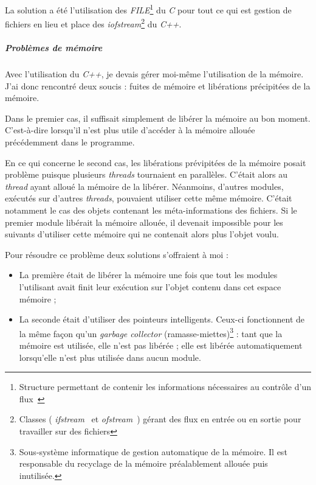 \documentclass[a4paper,10pt, twoside]{report}
\begin{document}
\begin{spacing}{1.2}
La solution a été l'utilisation des \textit{FILE}\footnote{Structure
permettant de contenir les informations nécessaires au contrôle d'un
flux~\cite{refFILE}} du \textit{C} pour tout ce qui est gestion de fichiers en
lieu et place des \textit{iofstream}\footnote{Classes (
\textit{ifstream}~\cite{refIFS} et \textit{ofstream}~\cite{refOFS}) gérant
des flux en entrée ou en sortie pour travailler sur des fichiers} du
\textit{C++}.

\subparagraph{Problèmes de mémoire}

\bigskip

Avec l'utilisation du \textit{C++}, je devais gérer moi-même l'utilisation
de la mémoire. J'ai donc rencontré deux soucis : fuites de mémoire et
libérations précipitées de la mémoire.

Dans le premier cas, il suffisait simplement de libérer la mémoire au bon
moment. C'est-à-dire lorsqu'il n'est plus utile d'accéder à la mémoire
allouée précédemment dans le programme.

En ce qui concerne le second cas, les libérations prévipitées de la mémoire
posait problème puisque plusieurs
\textit{threads} tournaient en parallèles. C'était alors au
\textit{thread} ayant alloué la mémoire de la libérer. Néanmoins,
d'autres modules, exécutés sur d'autres \textit{threads}, pouvaient utiliser
cette même mémoire. C'était notamment le cas des objets contenant les
méta-informations des fichiers. Si le premier module libérait la mémoire
allouée, il devenait impossible pour les suivants d'utiliser cette mémoire
qui ne contenait alors plus l'objet voulu.

Pour résoudre ce problème deux solutions s'offraient à moi :

\begin{itemize}
 \item La première était de libérer la mémoire une fois que tout les
 modules l'utilisant avait finit leur exécution sur l'objet contenu dans cet
 espace mémoire ;
 \item La seconde était d'utiliser des pointeurs intelligents. Ceux-ci
 fonctionnent de la même façon qu'un \textit{garbage collector}
 (ramasse-miettes)\footnote{Sous-système informatique de gestion automatique
 de la mémoire. Il est responsable du recyclage de la mémoire
 préalablement allouée puis inutilisée.} : tant que la mémoire est
 utilisée, elle n'est pas libérée ; elle est libérée automatiquement
 lorsqu'elle n'est plus utilisée dans aucun module.
\end{itemize}


\end{spacing}
\end{document}
